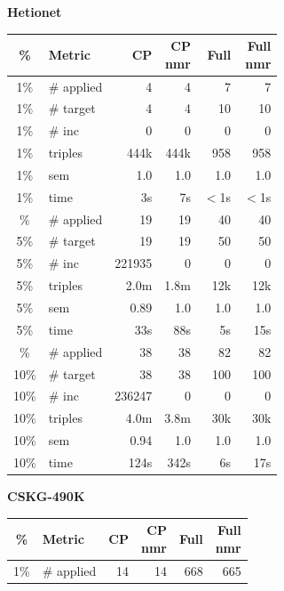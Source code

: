 \documentclass[a4paper,UKenglish,cleveref, autoref, thm-restate]{tgdk-v2021}
\begin{document}
\begin{table}[]
\begin{minipage}[t]{0.49\linewidth}
\centering
\textbf{Hetionet}\\
\begin{tabular}{c l | r r r r}
\toprule
\% & Metric & CP & \shortstack{CP\\nmr} & Full & \shortstack{Full\\nmr} \\
\midrule
1\%  & \# applied & 4 & 4 & 7 & 7 \\
1\%  & \# target  & 4 & 4 & 10 & 10 \\
1\%  & \# inc     & 0 & 0 & 0 & 0 \\
1\%  & triples    & 444k & 444k & 958 & 958 \\
1\% & sem       & 1.0 & 1.0  & 1.0 & 1.0\\
1\%  & time      & 3s & 7s & $<$1s & $<$1s \\
\addlinespace
5\%  & \# applied & 19 & 19 & 40 & 40 \\
5\%  & \# target  & 19 & 19 & 50 & 50 \\
5\%  & \# inc     & 221935 & 0 & 0 & 0 \\
5\%  & triples    & 2.0m & 1.8m & 12k & 12k \\
5\% & sem       & 0.89 & 1.0 & 1.0 &  1.0 \\
5\%  & time      & 33s & 88s & 5s & 15s \\
\addlinespace
10\% & \# applied & 38 & 38 & 82 & 82 \\
10\% & \# target  & 38 & 38 & 100 & 100 \\
10\% & \# inc     & 236247 & 0 & 0 & 0 \\
10\% & triples    & 4.0m & 3.8m & 30k & 30k \\
10\% & sem       & 0.94 & 1.0  & 1.0 & 1.0\\
10\% & time      & 124s & 342s & 6s & 17s \\
\bottomrule
\end{tabular}
\end{minipage}%
\hfill
\begin{minipage}[t]{0.49\linewidth}
\centering
\textbf{CSKG-490K}\\
\begin{tabular}{c l | r r r r}
\toprule
\% & Metric & CP & \shortstack{CP\\nmr} & Full & \shortstack{Full\\nmr} \\
\midrule
1\% & \# applied & 14 & 14 & 668 & 665 \\

\end{tabular}
\end{minipage}
\end{table}
\end{document}
